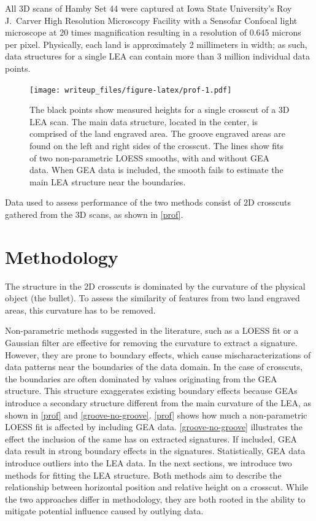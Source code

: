 \documentclass[12pt]{article}
\begin{document}
All 3D scans of Hamby Set 44 were captured at Iowa State University's
Roy J.~Carver High Resolution Microscopy Facility with a Sensofar
Confocal light microscope at 20 times magnification resulting in a
resolution of 0.645 microns per pixel. Physically, each land is
approximately 2 millimeters in width; as such, data structures for a
single LEA can contain more than 3 million individual data points.

\begin{figure}
\centering
\texttt{[image: writeup\_files/figure-latex/prof-1.pdf]}
\caption{\label{prof}The black points show measured heights for a single
crosscut of a 3D LEA scan. The main data structure, located in the
center, is comprised of the land engraved area. The groove engraved
areas are found on the left and right sides of the crosscut. The lines
show fits of two non-parametric LOESS smooths, with and without GEA
data. When GEA data is included, the smooth fails to estimate the main
LEA structure near the boundaries.}
\end{figure}

Data used to assess performance of the two methods consist of 2D
crosscuts gathered from the 3D scans, as shown in \autoref{prof}.

\section{Methodology}

The structure in the 2D crosscuts is dominated by the curvature of the
physical object (the bullet). To assess the similarity of features from
two land engraved areas, this curvature has to be removed.

Non-parametric methods suggested in the literature, such as a LOESS fit
\citep{Hare1} or a Gaussian filter \citep{Chu1} are effective for
removing the curvature to extract a signature. However, they are prone
to boundary effects, which cause mischaracterizations of data patterns
near the boundaries of the data domain. In the case of crosscuts, the
boundaries are often dominated by values originating from the GEA
structure. This structure exaggerates existing boundary effects because
GEAs introduce a secondary structure different from the main curvature
of the LEA, as shown in \autoref{prof} and \autoref{groove-no-groove}.
\autoref{prof} shows how much a non-parametric LOESS fit is affected by
including GEA data. \autoref{groove-no-groove} illustrates the effect
the inclusion of the same has on extracted signatures. If included, GEA
data result in strong boundary effects in the signatures. Statistically,
GEA data introduce outliers into the LEA data. In the next sections, we
introduce two methods for fitting the LEA structure. Both methods aim to
describe the relationship between horizontal position and relative
height on a crosscut. While the two approaches differ in methodology,
they are both rooted in the ability to mitigate potential influence
caused by outlying data.
\end{document}
